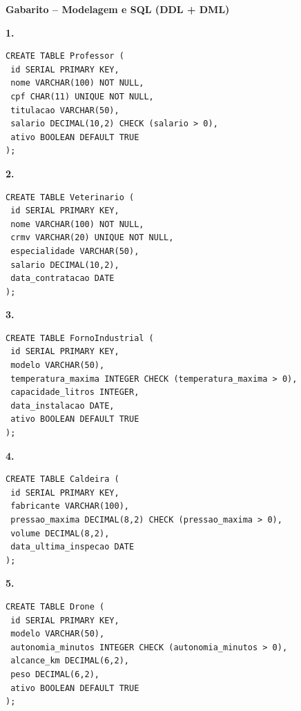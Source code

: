 \documentclass[12pt]{article}
\begin{document}
\begin{center}
{\Large \textbf{Gabarito – Modelagem e SQL (DDL + DML)}}
\end{center}

\vspace{0.5cm}

\textbf{1.}
\begin{resposta}
\begin{lstlisting}
CREATE TABLE Professor (
 id SERIAL PRIMARY KEY,
 nome VARCHAR(100) NOT NULL,
 cpf CHAR(11) UNIQUE NOT NULL,
 titulacao VARCHAR(50),
 salario DECIMAL(10,2) CHECK (salario > 0),
 ativo BOOLEAN DEFAULT TRUE
);
\end{lstlisting}
\end{resposta}

\textbf{2.}
\begin{resposta}
\begin{lstlisting}
CREATE TABLE Veterinario (
 id SERIAL PRIMARY KEY,
 nome VARCHAR(100) NOT NULL,
 crmv VARCHAR(20) UNIQUE NOT NULL,
 especialidade VARCHAR(50),
 salario DECIMAL(10,2),
 data_contratacao DATE
);
\end{lstlisting}
\end{resposta}

\textbf{3.}
\begin{resposta}
\begin{lstlisting}
CREATE TABLE FornoIndustrial (
 id SERIAL PRIMARY KEY,
 modelo VARCHAR(50),
 temperatura_maxima INTEGER CHECK (temperatura_maxima > 0),
 capacidade_litros INTEGER,
 data_instalacao DATE,
 ativo BOOLEAN DEFAULT TRUE
);
\end{lstlisting}
\end{resposta}

\textbf{4.}
\begin{resposta}
\begin{lstlisting}
CREATE TABLE Caldeira (
 id SERIAL PRIMARY KEY,
 fabricante VARCHAR(100),
 pressao_maxima DECIMAL(8,2) CHECK (pressao_maxima > 0),
 volume DECIMAL(8,2),
 data_ultima_inspecao DATE
);
\end{lstlisting}
\end{resposta}

\textbf{5.}
\begin{resposta}
\begin{lstlisting}
CREATE TABLE Drone (
 id SERIAL PRIMARY KEY,
 modelo VARCHAR(50),
 autonomia_minutos INTEGER CHECK (autonomia_minutos > 0),
 alcance_km DECIMAL(6,2),
 peso DECIMAL(6,2),
 ativo BOOLEAN DEFAULT TRUE
);
\end{lstlisting}
\end{resposta}
\end{document}
